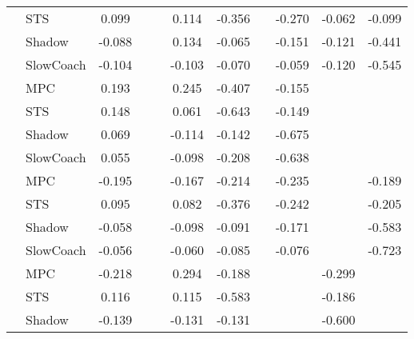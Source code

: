 \begin{tabular}{|l|l|*{9}{c|}}
                                                           & STS &    0.099 &        &        &  0.114 & -0.356 &     &  -0.270 &  -0.062 &   -0.099 \\
                                                           & Shadow &   -0.088 &        &        &  0.134 & -0.065 &     &  -0.151 &  -0.121 &   -0.441 \\
                                                           & SlowCoach &   -0.104 &        &        & -0.103 & -0.070 &     &  -0.059 &  -0.120 &   -0.545 \\
\midrule
[True, False, False, True, True, False, True, False, False] & MPC &    0.193 &        &        &  0.245 & -0.407 &     &  -0.155 &      &       \\
                                                           & STS &    0.148 &        &        &  0.061 & -0.643 &     &  -0.149 &      &       \\
                                                           & Shadow &    0.069 &        &        & -0.114 & -0.142 &     &  -0.675 &      &       \\
                                                           & SlowCoach &    0.055 &        &        & -0.098 & -0.208 &     &  -0.638 &      &       \\
\midrule
[True, False, False, True, True, False, True, False, True] & MPC &   -0.195 &        &        & -0.167 & -0.214 &     &  -0.235 &      &   -0.189 \\
                                                           & STS &    0.095 &        &        &  0.082 & -0.376 &     &  -0.242 &      &   -0.205 \\
                                                           & Shadow &   -0.058 &        &        & -0.098 & -0.091 &     &  -0.171 &      &   -0.583 \\
                                                           & SlowCoach &   -0.056 &        &        & -0.060 & -0.085 &     &  -0.076 &      &   -0.723 \\
\midrule
[True, False, False, True, True, False, False, True, False] & MPC &   -0.218 &        &        &  0.294 & -0.188 &     &      &  -0.299 &       \\
                                                           & STS &    0.116 &        &        &  0.115 & -0.583 &     &      &  -0.186 &       \\
                                                           & Shadow &   -0.139 &        &        & -0.131 & -0.131 &     &      &  -0.600 &       \\

\end{tabular}
